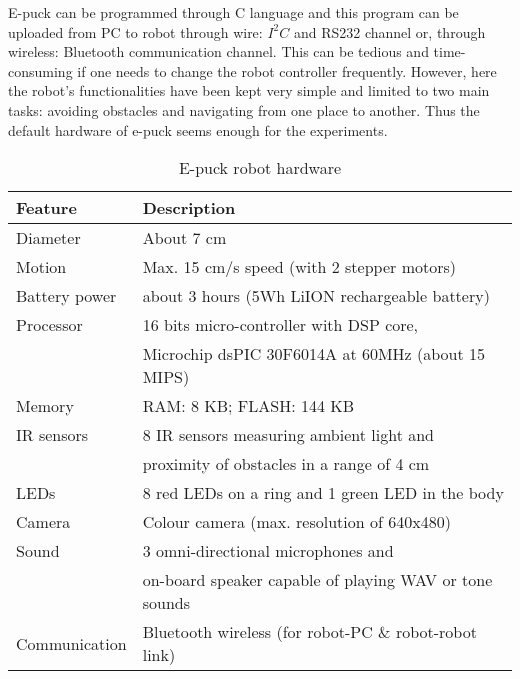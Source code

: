 E-puck can be programmed through C language and this program can be uploaded from PC to robot through wire: $I^{2}C$ and RS232 channel or, through  wireless: Bluetooth communication channel. This can be tedious and time-consuming if one needs to change the robot controller frequently. However, here  the robot's functionalities have been kept very simple and limited to two main tasks: avoiding obstacles and navigating from one place to another. Thus the default hardware of e-puck seems enough for the experiments.
\begin{table}
\caption{E-puck robot hardware}
\label{table:epuck}
\begin{center}
\begin{tabular}{|l|l|}
\hline \textbf{Feature} & \textbf{Description}\\
\hline Diameter & About 7 cm\\
\hline Motion & Max. 15 cm/s speed (with 2 stepper motors)\\
\hline Battery power & about 3 hours (5Wh LiION rechargeable battery)\\
\hline Processor & 16 bits micro-controller with DSP core,\\ & Microchip dsPIC 30F6014A at 60MHz (about 15 MIPS)\\
\hline Memory & RAM: 8 KB; FLASH: 144 KB \\
\hline IR sensors & 8 IR sensors measuring ambient light and \\ & proximity of obstacles in a range of 4 cm\\
\hline LEDs & 8 red LEDs on a ring and 1 green LED in the body \\
\hline Camera & Colour camera (max. resolution of 640x480) \\
\hline Sound & 3 omni-directional microphones and\\ & on-board speaker capable of playing WAV or tone sounds\\
\hline Communication & Bluetooth wireless (for robot-PC \& robot-robot link)\\
\hline
\end{tabular}
\end{center}
\end{table}
